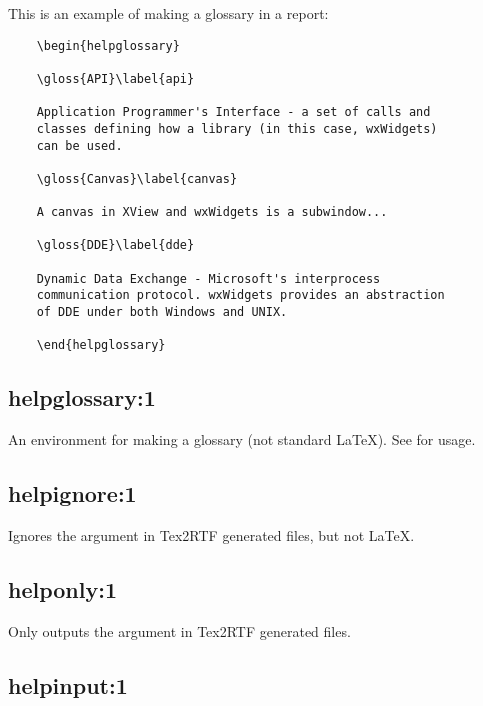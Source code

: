 This is an example of making a glossary in a report:

\begin{verbatim}
    \begin{helpglossary}

    \gloss{API}\label{api}

    Application Programmer's Interface - a set of calls and
    classes defining how a library (in this case, wxWidgets)
    can be used.

    \gloss{Canvas}\label{canvas}

    A canvas in XView and wxWidgets is a subwindow...

    \gloss{DDE}\label{dde}

    Dynamic Data Exchange - Microsoft's interprocess
    communication protocol. wxWidgets provides an abstraction
    of DDE under both Windows and UNIX.

    \end{helpglossary}
\end{verbatim}

\subsection*{helpglossary:1}\label{helpglossary}

An environment for making a glossary (not standard \LaTeX). See  for
usage.

\subsection*{helpignore:1}\label{helpignore}

Ignores the argument in Tex2RTF generated files, but not \LaTeX.

\subsection*{helponly:1}\label{helponly}

Only outputs the argument in Tex2RTF generated files.

\subsection*{helpinput:1}\label{helpinput}

